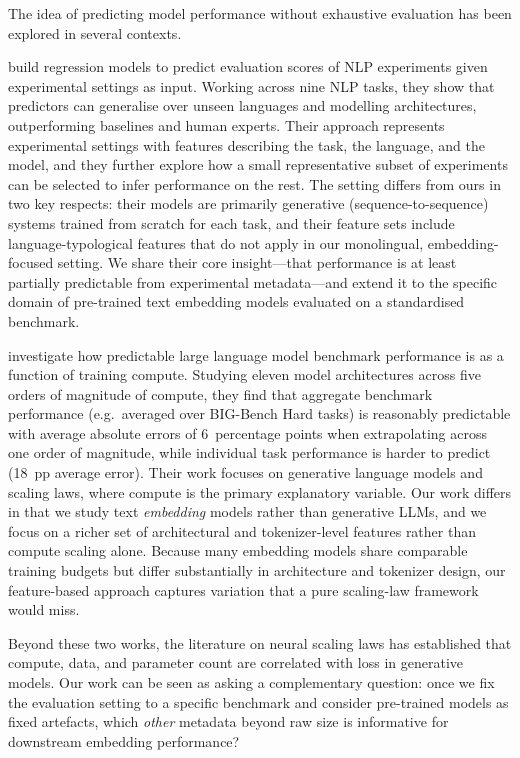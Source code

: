 \documentclass[11pt,a4paper,twocolumn]{article}
\begin{document}
The idea of predicting model performance without exhaustive evaluation has been explored in several contexts.

\citet{xia2020predicting} build regression models to predict evaluation scores of NLP experiments given experimental settings as input.
Working across nine NLP tasks, they show that predictors can generalise over unseen languages and modelling architectures, outperforming baselines and human experts.
Their approach represents experimental settings with features describing the task, the language, and the model, and they further explore how a small representative subset of experiments can be selected to infer performance on the rest.
The setting differs from ours in two key respects: their models are primarily generative (sequence-to-sequence) systems trained from scratch for each task, and their feature sets include language-typological features that do not apply in our monolingual, embedding-focused setting.
We share their core insight---that performance is at least partially predictable from experimental metadata---and extend it to the specific domain of pre-trained text embedding models evaluated on a standardised benchmark.

\citet{owen2024predictable} investigate how predictable large language model benchmark performance is as a function of training compute.
Studying eleven model architectures across five orders of magnitude of compute, they find that aggregate benchmark performance (e.g.\ averaged over BIG-Bench Hard tasks) is reasonably predictable with average absolute errors of 6~percentage points when extrapolating across one order of magnitude, while individual task performance is harder to predict (18~pp average error).
Their work focuses on generative language models and scaling laws, where compute is the primary explanatory variable.
Our work differs in that we study text \emph{embedding} models rather than generative LLMs, and we focus on a richer set of architectural and tokenizer-level features rather than compute scaling alone.
Because many embedding models share comparable training budgets but differ substantially in architecture and tokenizer design, our feature-based approach captures variation that a pure scaling-law framework would miss.

Beyond these two works, the literature on neural scaling laws \citep{kaplan2020scaling, hoffmann2022training} has established that compute, data, and parameter count are correlated with loss in generative models.
Our work can be seen as asking a complementary question: once we fix the evaluation setting to a specific benchmark and consider pre-trained models as fixed artefacts, which \emph{other} metadata beyond raw size is informative for downstream embedding performance?
\end{document}
